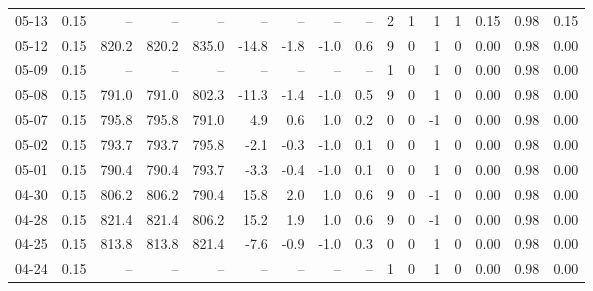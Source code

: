 \begin{threeparttable}
{\begin{tabular}{lrrrrrrrrrrrrrrr}
  05-13 &     0.15 &    -- &    -- &    -- &         -- &             -- &                       -- &                  -- &              2 &         1 &     1 &         1 &       0.15 &      0.98 &           0.15 \\
  05-12 &     0.15 & 820.2 & 820.2 & 835.0 &      -14.8 &           -1.8 &                     -1.0 &                 0.6 &              9 &         0 &     1 &         0 &       0.00 &      0.98 &           0.00 \\
  05-09 &     0.15 &    -- &    -- &    -- &         -- &             -- &                       -- &                  -- &              1 &         0 &     1 &         0 &       0.00 &      0.98 &           0.00 \\
  05-08 &     0.15 & 791.0 & 791.0 & 802.3 &      -11.3 &           -1.4 &                     -1.0 &                 0.5 &              9 &         0 &     1 &         0 &       0.00 &      0.98 &           0.00 \\
  05-07 &     0.15 & 795.8 & 795.8 & 791.0 &        4.9 &            0.6 &                      1.0 &                 0.2 &              0 &         0 &    -1 &         0 &       0.00 &      0.98 &           0.00 \\
  05-02 &     0.15 & 793.7 & 793.7 & 795.8 &       -2.1 &           -0.3 &                     -1.0 &                 0.1 &              0 &         0 &     1 &         0 &       0.00 &      0.98 &           0.00 \\
  05-01 &     0.15 & 790.4 & 790.4 & 793.7 &       -3.3 &           -0.4 &                     -1.0 &                 0.1 &              0 &         0 &     1 &         0 &       0.00 &      0.98 &           0.00 \\
  04-30 &     0.15 & 806.2 & 806.2 & 790.4 &       15.8 &            2.0 &                      1.0 &                 0.6 &              9 &         0 &    -1 &         0 &       0.00 &      0.98 &           0.00 \\
  04-28 &     0.15 & 821.4 & 821.4 & 806.2 &       15.2 &            1.9 &                      1.0 &                 0.6 &              9 &         0 &    -1 &         0 &       0.00 &      0.98 &           0.00 \\
  04-25 &     0.15 & 813.8 & 813.8 & 821.4 &       -7.6 &           -0.9 &                     -1.0 &                 0.3 &              0 &         0 &     1 &         0 &       0.00 &      0.98 &           0.00 \\
  04-24 &     0.15 &    -- &    -- &    -- &         -- &             -- &                       -- &                  -- &              1 &         0 &     1 &         0 &       0.00 &      0.98 &           0.00 \\

\end{tabular}}
\end{threeparttable}
